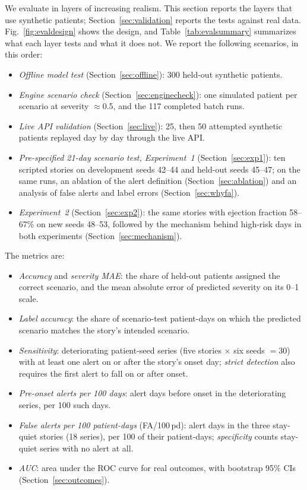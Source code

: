 \documentclass[conference]{IEEEtran}
\begin{document}
We evaluate in layers of increasing realism. This section reports the layers that use synthetic patients; Section~\ref{sec:validation} reports the tests against real data. Fig.~\ref{fig:evaldesign} shows the design, and Table~\ref{tab:evalsummary} summarizes what each layer tests and what it does not. We report the following scenarios, in this order:
\begin{itemize}
\item \emph{Offline model test} (Section~\ref{sec:offline}): 300 held-out synthetic patients.
\item \emph{Engine scenario check} (Section~\ref{sec:enginecheck}): one simulated patient per scenario at severity $\approx$0.5, and the 117 completed batch runs.
\item \emph{Live API validation} (Section~\ref{sec:live}): 25, then 50 attempted synthetic patients replayed day by day through the live API.
\item \emph{Pre-specified 21-day scenario test, Experiment~1} (Section~\ref{sec:exp1}): ten scripted stories on development seeds 42--44 and held-out seeds 45--47; on the same runs, an ablation of the alert definition (Section~\ref{sec:ablation}) and an analysis of false alerts and label errors (Section~\ref{sec:whyfa}).
\item \emph{Experiment~2} (Section~\ref{sec:exp2}): the same stories with ejection fraction 58--67\% on new seeds 48--53, followed by the mechanism behind high-risk days in both experiments (Section~\ref{sec:mechanism}).
\end{itemize}
The metrics are:
\begin{itemize}
\item \emph{Accuracy} and \emph{severity MAE}: the share of held-out patients assigned the correct scenario, and the mean absolute error of predicted severity on its 0--1 scale.
\item \emph{Label accuracy}: the share of scenario-test patient-days on which the predicted scenario matches the story's intended scenario.
\item \emph{Sensitivity}: deteriorating patient-seed series (five stories $\times$ six seeds $=30$) with at least one alert on or after the story's onset day; \emph{strict detection} also requires the first alert to fall on or after onset.
\item \emph{Pre-onset alerts per 100 days}: alert days before onset in the deteriorating series, per 100 such days.
\item \emph{False alerts per 100 patient-days} (FA/100\,pd): alert days in the three stay-quiet stories (18 series), per 100 of their patient-days; \emph{specificity} counts stay-quiet series with no alert at all.
\item \emph{AUC}: area under the ROC curve for real outcomes, with bootstrap 95\% CIs (Section~\ref{sec:outcomes}).
\end{itemize}
\end{document}
